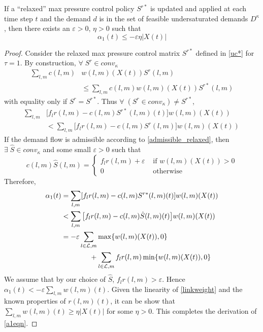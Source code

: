  \begin{Lem} \label{alpha1bound}
If a ``relaxed'' max pressure control policy $S^{r*}$ is updated and applied at each time step $t$ and the demand $d$ is in the set of feasible undersaturated demands $D^\kappa$, then there exists an $\varepsilon>0$, $\eta>0$ such that 
\begin{equation} \label{a1eqn} 
\alpha_1(t)  \leq -\varepsilon \eta \big| X(t)\big| 
\end{equation}
\end{Lem}
\begin{proof}
Consider the relaxed max pressure control matrix $S^{r*}$ defined in \eqref{uc*} for $\tau =1$. By construction, $ \forall \; S^r \in conv_{\kappa}$
\begin{align} \nonumber
\sum_{l,m}c(l,m)& w(l,m)(X(t))S^r (l,m) \\
&\leq \sum_{l,m}c(l,m)w(l,m)(X(t))S^{r*}(l,m) 
\end{align}
with equality only if $S^r = S^{r*}$. 
Thus $\forall \; (S^r  \in conv_{\kappa}) \neq S^{r*}$,
\begin{align} \nonumber
 \sum_{l,m}&\big[f_{l}r(l,m) - c(l,m)S^{r*}(l,m)(t)\big]w(l,m)(X(t)) \\
&<   \sum_{l,m}\big[f_{l}r(l,m) - c(l,m)S^r(l,m)\big]w(l,m)(X(t))
\end{align}
If the demand flow is admissible according to \eqref{admissible_relaxed}, then 
$\exists \; \hat{S} \in conv_{\kappa}$ and some small $\varepsilon>0$ such that 
\begin{equation} \nonumber
c(l,m)\hat{S} (l,m) = \begin{cases}
        f_{l}r(l,m) + \varepsilon & \text{ if } w(l,m)(X(t)) > 0 \\
        0 & \text{ otherwise}
    \end{cases}
\end{equation}
Therefore, 
\begin{align} \nonumber
 \alpha_1(t) &= \sum_{l,m}[f_{l}r(l,m) -  c(l,m)S^{r*}(l,m)(t)] w(l,m)(X(t))  \\ \nonumber
 &< \sum_{l,m}\big[f_{l}r(l,m) -  c(l,m)\hat{S}(l,m)(t)\big] w(l,m)(X(t)) \\ 
&  = -\varepsilon \sum_{l \in \mathcal{L},m} \max\{w(l,m)(X(t)) ,0\} \\ \nonumber
&\qquad \qquad +  \sum_{l \in \mathcal{L},m}  f_l r(l,m)  \min\{ w(l,m)(X(t)) ,0\}
\end{align}
We assume that by our choice of $\hat{S}$, $f_{l}r(l,m) > \varepsilon$. Hence
$\alpha_1(t) < -\varepsilon \sum_{l,m}w(l,m)(t)$. 
Given the linearity of \eqref{linkweight} and the known properties of $r(l,m)(t)$, it can be show that $\sum_{l,m}w(l,m)(t) \geq \eta |X(t)|$ for some $\eta >0$. This completes the derivation of \eqref{a1eqn}.
\end{proof}
